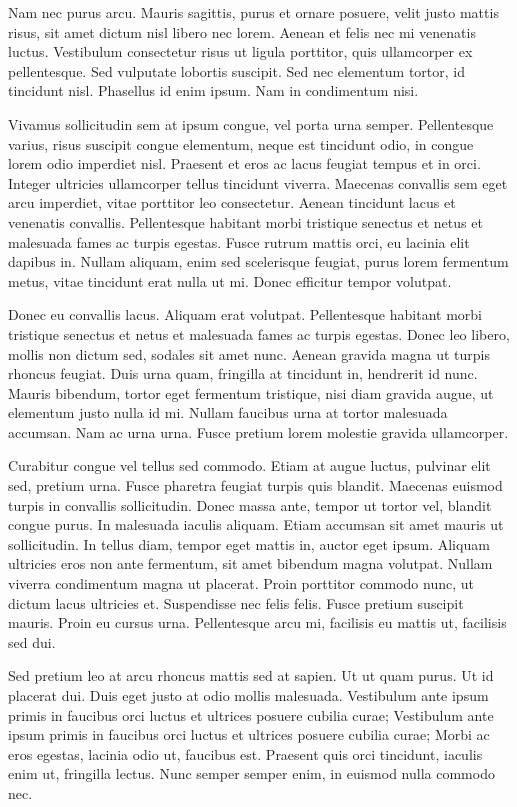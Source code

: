 Nam nec purus arcu.
Mauris sagittis, purus et ornare posuere, velit justo mattis risus, sit amet dictum nisl libero nec lorem.
Aenean et felis nec mi venenatis luctus.
Vestibulum consectetur risus ut ligula porttitor, quis ullamcorper ex pellentesque.
Sed vulputate lobortis suscipit.
Sed nec elementum tortor, id tincidunt nisl.
Phasellus id enim ipsum.
Nam in condimentum nisi.

Vivamus sollicitudin sem at ipsum congue, vel porta urna semper.
Pellentesque varius, risus suscipit congue elementum, neque est tincidunt odio, in congue lorem odio imperdiet nisl.
Praesent et eros ac lacus feugiat tempus et in orci.
Integer ultricies ullamcorper tellus tincidunt viverra.
Maecenas convallis sem eget arcu imperdiet, vitae porttitor leo consectetur.
Aenean tincidunt lacus et venenatis convallis.
Pellentesque habitant morbi tristique senectus et netus et malesuada fames ac turpis egestas.
Fusce rutrum mattis orci, eu lacinia elit dapibus in.
Nullam aliquam, enim sed scelerisque feugiat, purus lorem fermentum metus, vitae tincidunt erat nulla ut mi.
Donec efficitur tempor volutpat.

Donec eu convallis lacus.
Aliquam erat volutpat.
Pellentesque habitant morbi tristique senectus et netus et malesuada fames ac turpis egestas.
Donec leo libero, mollis non dictum sed, sodales sit amet nunc.
Aenean gravida magna ut turpis rhoncus feugiat.
Duis urna quam, fringilla at tincidunt in, hendrerit id nunc.
Mauris bibendum, tortor eget fermentum tristique, nisi diam gravida augue, ut elementum justo nulla id mi.
Nullam faucibus urna at tortor malesuada accumsan.
Nam ac urna urna.
Fusce pretium lorem molestie gravida ullamcorper.

Curabitur congue vel tellus sed commodo.
Etiam at augue luctus, pulvinar elit sed, pretium urna.
Fusce pharetra feugiat turpis quis blandit.
Maecenas euismod turpis in convallis sollicitudin.
Donec massa ante, tempor ut tortor vel, blandit congue purus.
In malesuada iaculis aliquam.
Etiam accumsan sit amet mauris ut sollicitudin.
In tellus diam, tempor eget mattis in, auctor eget ipsum.
Aliquam ultricies eros non ante fermentum, sit amet bibendum magna volutpat.
Nullam viverra condimentum magna ut placerat.
Proin porttitor commodo nunc, ut dictum lacus ultricies et.
Suspendisse nec felis felis.
Fusce pretium suscipit mauris.
Proin eu cursus urna.
Pellentesque arcu mi, facilisis eu mattis ut, facilisis sed dui.

Sed pretium leo at arcu rhoncus mattis sed at sapien.
Ut ut quam purus.
Ut id placerat dui.
Duis eget justo at odio mollis malesuada.
Vestibulum ante ipsum primis in faucibus orci luctus et ultrices posuere cubilia curae; Vestibulum ante ipsum primis in faucibus orci luctus et ultrices posuere cubilia curae; Morbi ac eros egestas, lacinia odio ut, faucibus est.
Praesent quis orci tincidunt, iaculis enim ut, fringilla lectus.
Nunc semper semper enim, in euismod nulla commodo nec.

